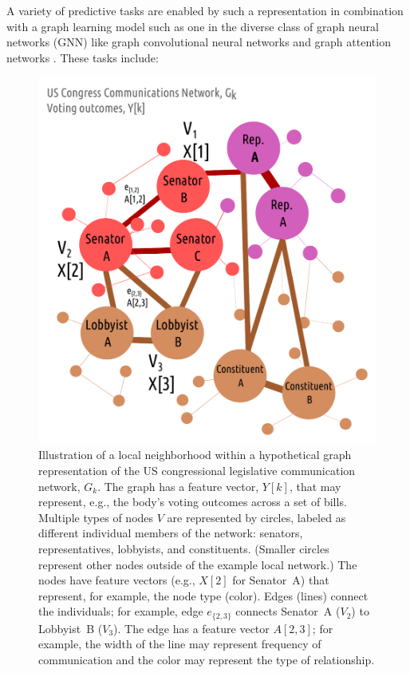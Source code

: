 \documentclass[nonacm,12pt]{acmart}
\begin{document}
A variety of predictive tasks are enabled by such a representation in combination with a graph learning model such as one in the diverse class of graph neural networks (GNN) like graph convolutional neural networks and graph attention networks \cite{muzio_biological_2021}.  These tasks include:

\begin{figure}[h]
  \centering
  \includegraphics[width=0.8\linewidth]{graph_label_prediction.pdf}
  \caption{
  \label{fig:graph}
      Illustration of a local neighborhood within a hypothetical graph representation of the US congressional legislative communication network, $G_k$. 
      The graph has a feature vector, $Y[k]$, that may represent, e.g., the body's voting outcomes across a set of bills.
      Multiple types of nodes $V$ are represented by circles, labeled as different individual members of the network: senators, representatives, lobbyists, and constituents.
      (Smaller circles represent other nodes outside of the example local network.)
      The nodes have feature vectors (e.g., $X[2]$ for Senator~A) that represent, for example, the node type (color).
      Edges (lines) connect the individuals; for example, edge $e_{\{2,3\}}$ connects Senator~A ($V_2$) to Lobbyist~B ($V_3$).
      The edge has a feature vector $A[2,3]$; for example, the width of the line may represent frequency of communication and the color may represent the type of relationship.
  }
\end{figure}
\end{document}
